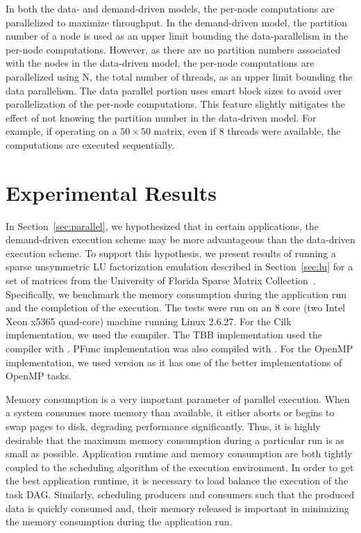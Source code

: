 \documentclass[10pt,conference]{IEEEtran}
\begin{document}
In both the data- and demand-driven models, the per-node computations are
parallelized to maximize throughput. In the demand-driven model, the partition
number of a node is used as an upper limit bounding the data-parallelism in the
per-node computations. However, as there are no partition numbers associated
with the nodes in the data-driven model, the per-node computations are
parallelized using N, the total number of threads, as an upper limit bounding
the data parallelism. The data parallel portion uses smart block sizes to avoid
over parallelization of the per-node computations. This feature slightly
mitigates the effect of not knowing the partition number in the data-driven
model.  For example, if operating on a $50 \times 50$ matrix, even if $8$
threads were available, the computations are executed sequentially. 

\section{Experimental Results}
\label{sec:results}
In Section~\ref{sec:parallel}, we hypothesized that in certain applications,
the demand-driven execution scheme may be more advantageous than the
data-driven execution scheme.  To support this hypothesis, we present results
of running a sparse unsymmetric LU factorization emulation described in
Section~\ref{sec:lu} for a set of matrices from the University of Florida
Sparse Matrix Collection~\cite{davissparse}. Specifically, we benchmark the
memory consumption during the application run and the completion of the
execution.
%
The tests were run on an 8 core (two Intel Xeon x5365 quad-core) machine
running Linux 2.6.27.  For the Cilk implementation, we used the  compiler.  The TBB implementation used the  compiler
with .  PFunc implementation was also compiled with . For the OpenMP implementation, we used  version
 as it has one of the better implementations of OpenMP tasks.

%
Memory consumption is a very important parameter of parallel execution.  When a
system consumes more memory than available, it either aborts or begins to swap
pages to disk, degrading performance significantly. Thus, it is highly
desirable that the maximum memory consumption during a particular run is
as small as possible.
%
Application runtime and memory consumption are both tightly coupled to the
scheduling algorithm of the execution environment. In order to get the best
application runtime, it is necessary to load balance the execution of the task
DAG. Similarly, scheduling producers and consumers such that the produced data
is quickly consumed and, their memory released is important in
minimizing the memory consumption during the application run.
\end{document}
